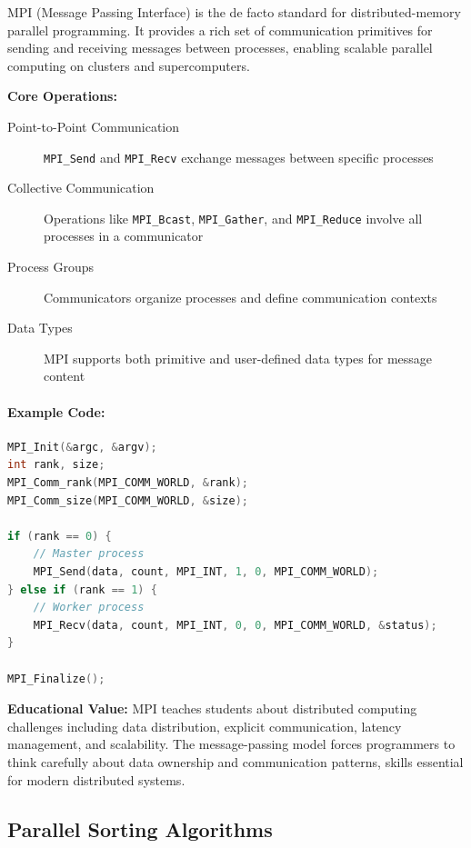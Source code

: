 MPI (Message Passing Interface) is the de facto standard for distributed-memory parallel programming. It provides a rich set of communication primitives for sending and receiving messages between processes, enabling scalable parallel computing on clusters and supercomputers.

\textbf{Core Operations:}
\begin{description}
    \item[Point-to-Point Communication] \texttt{MPI\_Send} and \texttt{MPI\_Recv} exchange messages between specific processes
    \item[Collective Communication] Operations like \texttt{MPI\_Bcast}, \texttt{MPI\_Gather}, and \texttt{MPI\_Reduce} involve all processes in a communicator
    \item[Process Groups] Communicators organize processes and define communication contexts
    \item[Data Types] MPI supports both primitive and user-defined data types for message content
\end{description}

\paragraph*{Example Code:}

\begin{lstlisting}[language=C++, caption={Simple MPI message passing}]
MPI_Init(&argc, &argv);
int rank, size;
MPI_Comm_rank(MPI_COMM_WORLD, &rank);
MPI_Comm_size(MPI_COMM_WORLD, &size);

if (rank == 0) {
    // Master process
    MPI_Send(data, count, MPI_INT, 1, 0, MPI_COMM_WORLD);
} else if (rank == 1) {
    // Worker process
    MPI_Recv(data, count, MPI_INT, 0, 0, MPI_COMM_WORLD, &status);
}

MPI_Finalize();
\end{lstlisting}

\textbf{Educational Value:} MPI teaches students about distributed computing challenges including data distribution, explicit communication, latency management, and scalability. The message-passing model forces programmers to think carefully about data ownership and communication patterns, skills essential for modern distributed systems.

\subsection{Parallel Sorting Algorithms}
\label{subsec:parallel-sorting}

